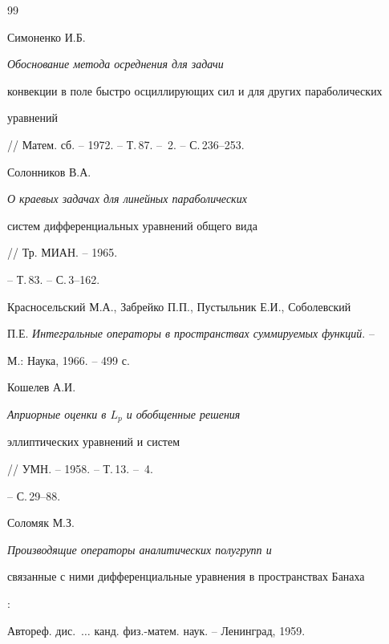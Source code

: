 \begin{thebibliography}{99}


Симоненко И.Б. {\em Обоснование метода осреднения для задачи 


конвекции в поле быстро осциллирующих сил и для других параболических 


уравнений} // Матем. сб. -- 1972. -- Т.\,87. -- \No\,2. -- С.\,236--253.  




Солонников В.А. {\em О краевых задачах для линейных параболических 


систем дифференциальных уравнений общего вида} // Тр. МИАН. -- 1965. 


-- Т.\,83. -- С.\,3--162. 




Красносельский М.А., Забрейко П.П., Пустыльник Е.И., Соболевский 


П.Е. {\em Интегральные операторы в пространствах суммируемых функций}. -- 


М.: Наука, 1966. -- 499 с. 




Кошелев А.И. {\em Априорные оценки в $L_p$ и обобщенные решения 


эллиптических уравнений и систем} // УМН. -- 1958. -- Т.\,13. -- \No\,4. 


-- С.\,29--88. 




Соломяк М.З. {\em Производящие операторы аналитических полугрупп и  


связанные с ними дифференциальные уравнения в пространствах Банаха}: 


Автореф. дис.~$\dotsc$ канд. физ.-матем. наук. -- Ленинград, 1959.


 


\end{thebibliography} 


 


\vskip 2cm 


 






 


\label{end} 


 


